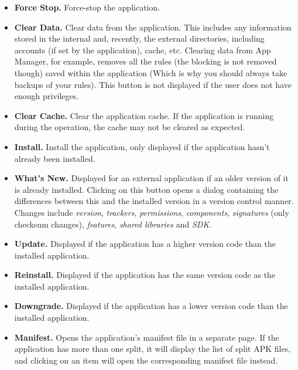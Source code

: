 \begin{itemize}
    \item \textbf{Force Stop.} Force-stop the application.

    \item \textbf{Clear Data.} Clear data from the application. This includes any information stored in the internal
    and, recently, the external directories, including accounts (if set by the application), cache, etc. Clearing data
    from App Manager, for example, removes all the rules (the blocking is not removed though) saved within the
    application (Which is why you should always take backups of your rules). This button is not displayed if the user
    does not have enough privileges.

    \item \textbf{Clear Cache.} Clear the application cache. If the application is running during the operation, the
    cache may not be cleared as expected.

    \item \textbf{Install.} Install the application, only displayed if the application hasn't
    already been installed.

    \item \textbf{What's New.} Displayed for an external application if an older version of it is
    already installed. Clicking on this button opens a dialog containing the differences between
    this and the installed version in a version control manner. Changes include \textit{version},
    \textit{trackers}, \textit{permissions}, \textit{components}, \textit{signatures} (only checksum
    changes), \textit{features}, \textit{shared libraries} and \textit{SDK}.

    \item \textbf{Update.} Displayed if the application has a higher version code than the installed application.

    \item \textbf{Reinstall.} Displayed if the application has the same version code as the installed application.

    \item \textbf{Downgrade.} Displayed if the application has a lower version code than the installed application.

    \item \textbf{Manifest.} Opens the application's manifest file in a separate page. If the
    application has more than one split, it will display the list of split APK files, and clicking
    on an item will open the corresponding manifest file instead.


\end{itemize}
